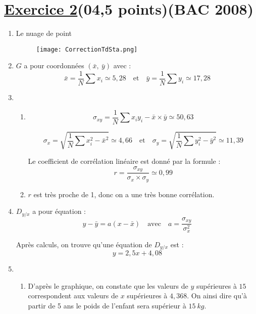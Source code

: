 \documentclass[12pt,a4paper]{article}
\begin{document}
\section*{\underline{Exercice 2}(04,5 points)(BAC 2008)} 
\begin{enumerate}
\item Le nuage de point
          \begin{center}
              \begin{figure}[H]%
                  \centering
                  \texttt{[image: CorrectionTdSta.png]}
                  \label{fig:monimage}
              \end{figure}
          \end{center}
\item \( G \) a pour coordonnées \( (\bar{x},\ \bar{y}) \) avec :
\[
\bar{x} = \frac{1}{N} \sum x_i \simeq 5{,}28 \quad \text{et} \quad \bar{y} = \frac{1}{N} \sum y_i \simeq 17{,}28
\]
\item 
\begin{enumerate}
\item 
\[
\sigma_{xy} = \frac{1}{N} \sum x_i y_i - \bar{x} \times \bar{y} \simeq 50{,}63
\]

\[
\sigma_x = \sqrt{ \frac{1}{N} \sum x_i^2 - \bar{x}^2 } \simeq 4{,}66
\quad \text{et} \quad
\sigma_y = \sqrt{ \frac{1}{N} \sum y_i^2 - \bar{y}^2 } \simeq 11{,}39
\]

Le coefficient de corrélation linéaire est donné par la formule :
\[
r = \frac{\sigma_{xy}}{\sigma_x \times \sigma_y} \simeq 0{,}99
\]

\item \( r \) est très proche de 1, donc on a une très bonne corrélation.
\end{enumerate}
\vspace{0.5cm}

\item \( D_{y/x} \) a pour équation :
\[
y - \bar{y} = a(x - \bar{x})
\quad \text{avec} \quad a = \frac{\sigma_{xy}}{\sigma_x^2}
\]

\vspace{0.2cm}

Après calculs, on trouve qu’une équation de \( D_{y/x} \) est :
\[
y = 2{,}5x + 4{,}08
\]
\item
\begin{enumerate}
\item D’après le graphique, on constate que les valeurs de \( y \) supérieures à \( 15 \) correspondent aux valeurs de \( x \) supérieures à \( 4{,}368 \).
On ainsi dire qu’à partir de 5 ans le poids de l’enfant sera supérieur à \( 15~kg \).


\end{enumerate}
\end{enumerate}
\end{document}
